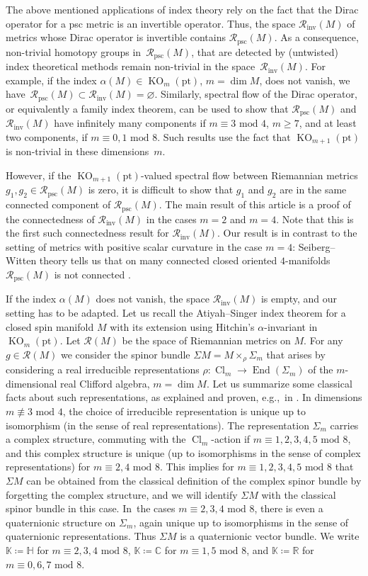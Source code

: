 \documentclass[pdftex]{sigma}
\newcommand\ceq{\coloneqq}
\newcommand\Cl{\mathop{\mathrm{Cl}}}
\newcommand\<{\langle}
\renewcommand\>{\rangle}
\newcommand\point{\mathrm{pt}}
\newcommand{\CC}{\mathbb C}
\newcommand{\HH}{\mathbb{H}}
\newcommand{\KK}{\mathbb K}
\newcommand{\RR}{\mathbb R}
\newcommand{\End}{\operatorname{End}}
\newcommand{\KO}{{\operatorname{KO}}}
\newcommand{\mod}{\,\,\mathrm{mod}\,\,}
\newcommand{\maR}{\mathcal R}
\theoremstyle{definition}
\newcommand\eg{e.g.,\ \ignorespaces}
\newcommand\={\,=\,}
\newcommand\Rinv{\maR_{\mathrm{inv}}}
\newcommand\Rpsc{\maR_{\mathrm{psc}}}
\numberwithin{equation}{section}
\begin{document}
The above mentioned applications of index theory rely on the fact that the Dirac operator for a psc metric is an invertible operator. Thus, the space $\Rinv(M)$ of metrics whose Dirac operator is invertible contains $\Rpsc(M)$. As a consequence, non-trivial homotopy groups in~$\Rpsc(M)$, that are detected by (untwisted) index theoretical methods remain non-trivial in the space~$\Rinv(M)$. For example, if the index $\alpha(M)\in \KO_m(\point)$, $m=\dim M$, does not vanish, we have~${\Rpsc(M)\subset\Rinv(M)=\varnothing}$. Similarly, spectral flow of the Dirac operator, or equivalently a family index theorem, can be used to show that $\Rpsc(M)$ and $\Rinv(M)$ have infinitely many components if $m\equiv 3 \mod 4$, $m\geq 7$, and at least two components, if $m\equiv 0,1\mod 8$. Such results use the fact that $\KO_{m+1}(\point)$ is non-trivial in these dimensions~$m$.

However, if the $\KO_{m+1}(\point)$-valued spectral flow between Riemannian metrics $g_1,g_2\!\in\! \Rpsc(M)$ is zero, it is difficult to show that $g_1$ and $g_2$ are in the same connected component of $\Rpsc(M)$. The main result of this article is a proof of the connectedness of $\Rinv(M)$ in the cases $m=2$ and $m=4$. Note that this is the first such connectedness result for $\Rinv(M)$. Our result is in contrast to the setting of metrics with positive scalar curvature in the case $m=4$: Seiberg--Witten theory tells us that on many connected closed oriented $4$-manifolds $\Rpsc(M)$ is not connected \cite[Sections~5 and~6]{ruberman:2001}.

If the index $\alpha(M)$ does not vanish, the space $\Rinv(M)$ is empty, and our setting has to be adapted. Let us recall the Atiyah--Singer index theorem for a closed spin manifold $M$ with its extension using Hitchin's $\alpha$-invariant in $\KO_m(\point)$. Let $\maR(M)$ be the space of Riemannian metrics on $M$.
For any $g\in \maR(M)$ we consider the spinor bundle $\Sigma M=M\times_\rho\Sigma_m$ that arises by considering a real irreducible representations $\rho\colon\Cl_m\to \End(\Sigma_m)$ of the $m$-dimensional real Clifford algebra, $m=\dim M$. Let us summarize some classical facts about such representations, as explained and proven, \eg in \cite[Theorem~I.5.8]{lawson.michelsohn:89}. In dimensions $m\not\equiv 3 \mod 4$, the choice of irreducible representation is unique up to isomorphism (in the sense of real representations).
The representation $\Sigma_m$ carries a complex structure, commuting with the $\Cl_m$-action if ${m\equiv 1,2,3,4,5\mod 8}$, and this complex structure is unique (up to isomorphisms in the sense of complex representations) for $m\equiv 2,4\mod 8$. This implies for $m\equiv 1,2,3,4,5\mod 8$ that~$\Sigma M$ can be obtained from the classical definition of the complex spinor bundle by forgetting the complex structure, and we will identify $\Sigma M$ with the classical spinor bundle in this case. In~the cases $m\equiv 2,3,4\mod 8$, there is even a quaternionic structure on $\Sigma_m$, again unique up to isomorphisms in the sense of quaternionic representations. Thus $\Sigma M$ is a quaternionic vector bundle. We write $\KK\ceq \HH$ for $m\equiv 2,3,4\mod 8$, $\KK\ceq \CC$ for $m\equiv 1,5\mod 8$, and $\KK\ceq \RR$ for~${m\equiv 0,6,7\mod 8}$.
\end{document}
